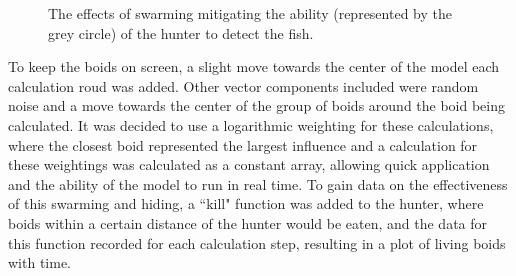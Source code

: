 \documentclass[
reprint,
showpacs,preprintnumbers,
amsmath,amssymb,
prl,
]{revtex4-1}
\begin{document}
\begin{figure}[!htp]
		\label{fig:swarming}
		\label{fig:noswarming}
		
	\caption{The effects of swarming mitigating the ability (represented by the grey circle) of the hunter to detect the fish.\cite{underwatervision}}

	\label{fig:swarmblindness}
\end{figure}

To keep the boids on screen, a slight move towards the center of the model each calculation roud was added.
Other vector components included were random noise and a move towards the center of the group of boids around the boid being calculated.
It was decided to use a logarithmic weighting for these calculations, where the closest boid represented the largest influence and a calculation for these weightings was calculated as a constant array, allowing quick application and the ability of the model to run in real time.
To gain data on the effectiveness of this swarming and hiding, a ``kill" function was added to the hunter, where boids within a certain distance of the hunter would be eaten, and the data for this function recorded for each calculation step, resulting in a plot of living boids with time.


	
	
\end{document}
